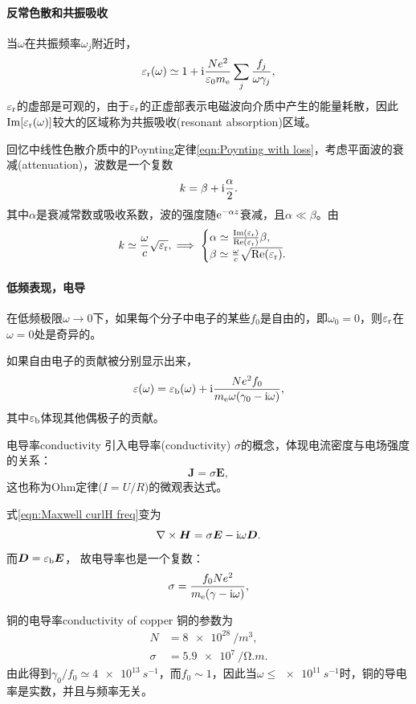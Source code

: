 \paragraph{反常色散和共振吸收}

当$\omega$在共振频率$\omega_j$附近时，
\[
    \varepsilon_\text r(\omega)\simeq 1+\mathrm{i}\frac{Ne^2}{\varepsilon_0m_\mathrm e}\sum_j\frac{f_j}{\omega\gamma_j},
\]
$\varepsilon_\text r$的虚部是可观的，由于$\varepsilon_\text r$的正虚部表示电磁波向介质中产生的能量耗散，因此$\operatorname{Im}[\varepsilon_\text r(\omega)]$较大的区域称为共振吸收(resonant absorption)区域。

回忆中线性色散介质中的Poynting定律\eqref{eqn:Poynting with loss}，考虑平面波的衰减(attenuation)，波数是一个复数
\[
    k=\beta+\mathrm{i}\frac\alpha 2.
\]
其中$\alpha$是衰减常数或吸收系数，波的强度随$\mathop{}\!\mathrm{e}^{-\alpha z}$衰减，且$\alpha\ll\beta$。由
\[
    k\simeq\frac\omega c\sqrt{\varepsilon_\text r},\implies
    \begin{cases}
        \alpha\simeq\frac{\operatorname{Im}(\varepsilon_\text r)}{\operatorname{Re}(\varepsilon_\text r)}\beta,\\
        \beta\simeq\frac\omega c\sqrt{\operatorname{Re}(\varepsilon_\text r)}.
    \end{cases}
\]

\paragraph{低频表现，电导}

在低频极限$\omega\to0$下，如果每个分子中电子的某些$f_0$是自由的，即$\omega_0=0$，则$\varepsilon_\text r$在$\omega=0$处是奇异的。

如果自由电子的贡献被分别显示出来，
\[
    \varepsilon(\omega)=\varepsilon_\text b(\omega)+\mathrm{i}\frac{Ne^2f_0}{m_\mathrm e\omega(\gamma_0-\mathrm{i}\omega)},
\]
其中$\varepsilon_\text b$体现其他偶极子的贡献。

\begin{definition}{电导率}{conductivity}
    引入电导率(conductivity) $\sigma$的概念，体现电流密度与电场强度的关系：
    \begin{equation}
        \bm J=\sigma\bm E,
    \end{equation}
    这也称为Ohm定律($I=U/R$)的微观表达式。
\end{definition}
式\eqref{eqn:Maxwell curlH freq}变为
\[
    \nabla\times\bm H=\sigma\bm E-\mathrm{i}\omega\bm D.
\]
而$\bm D=\varepsilon_\text b\bm E$，
故电导率也是一个复数：
\begin{equation}
    \sigma=\frac{f_0Ne^2}{m_\mathrm e(\gamma-\mathrm{i}\omega)},
\end{equation} 
\begin{example}{铜的电导率}{conductivity of copper}
    铜的参数为
    \begin{align*}
        N&=\SI{8e28}{/m^3},\\
        \sigma&=\SI{5.9e7}{/\ohm.m}.
    \end{align*}
    由此得到$\gamma_0/f_0\simeq\SI{4e13}{s^{-1}}$，而$f_0\sim 1$，因此当$\omega\leqslant\SI{e11}{s^{-1}}$时，铜的导电率是实数，并且与频率无关。
\end{example}

